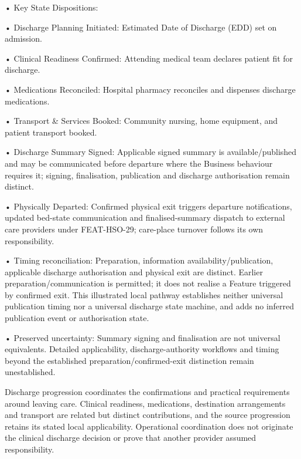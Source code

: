 •
Key State Dispositions:



•
Discharge Planning Initiated: Estimated Date of Discharge (EDD) set on admission.



•
Clinical Readiness Confirmed: Attending medical team declares patient fit for discharge.



•
Medications Reconciled: Hospital pharmacy reconciles and dispenses discharge medications.



•
Transport \& Services Booked: Community nursing, home equipment, and patient transport booked.



•
Discharge Summary Signed: Applicable signed summary is available/published and may be communicated before departure where the Business behaviour requires it; signing, finalisation, publication and discharge authorisation remain distinct.



•
Physically Departed: Confirmed physical exit triggers departure notifications, updated bed-state communication and finalised-summary dispatch to external care providers under FEAT-HSO-29; care-place turnover follows its own responsibility.



•
Timing reconciliation: Preparation, information availability/publication, applicable discharge authorisation and physical exit are distinct. Earlier preparation/communication is permitted; it does not realise a Feature triggered by confirmed exit. This illustrated local pathway establishes neither universal publication timing nor a universal discharge state machine, and adds no inferred publication event or authorisation state.



•
Preserved uncertainty: Summary signing and finalisation are not universal equivalents. Detailed applicability, discharge-authority workflows and timing beyond the established preparation/confirmed-exit distinction remain unestablished.



Discharge progression coordinates the confirmations and practical requirements around leaving care. Clinical readiness, medications, destination arrangements and transport are related but distinct contributions, and the source progression retains its stated local applicability. Operational coordination does not originate the clinical discharge decision or prove that another provider assumed responsibility.


